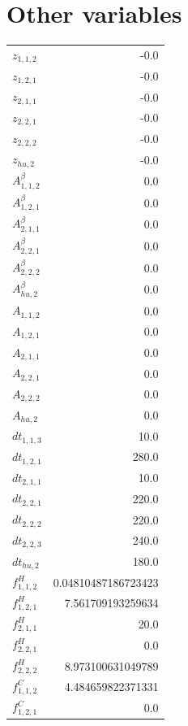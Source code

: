 \documentclass{article}%
\makeatletter
\let\mcnewpage=\newpage%
\newcommand{\TrickSupertabularIntoMulticols}{%
\renewcommand\newpage{%
\if@firstcolumn%
\hrule width\linewidth height0pt%
\columnbreak%
\else%
\mcnewpage%
\fi%
}%
}%
\makeatother
\begin{document}
\section{Other variables}%
\thispagestyle{plain}%
\begin{multicols*}{3}%
\TrickSupertabularIntoMulticols%
%
\begin{supertabular}{lr}%
	$z_{1,1,2}$ & -0.0 \\%
	$z_{1,2,1}$ & -0.0 \\%
	$z_{2,1,1}$ & -0.0 \\%
	$z_{2,2,1}$ & -0.0 \\%
	$z_{2,2,2}$ & -0.0 \\%
	$z_{hu,2}$ & -0.0 \\%
	$A_{1,1,2}^{\beta}$ & 0.0 \\%
	$A_{1,2,1}^{\beta}$ & 0.0 \\%
	$A_{2,1,1}^{\beta}$ & 0.0 \\%
	$A_{2,2,1}^{\beta}$ & 0.0 \\%
	$A_{2,2,2}^{\beta}$ & 0.0 \\%
	$A_{hu,2}^{\beta}$ & 0.0 \\%
	$A_{1,1,2}$ & 0.0 \\%
	$A_{1,2,1}$ & 0.0 \\%
	$A_{2,1,1}$ & 0.0 \\%
	$A_{2,2,1}$ & 0.0 \\%
	$A_{2,2,2}$ & 0.0 \\%
	$A_{hu,2}$ & 0.0 \\%
	$dt_{1,1,3}$ & 10.0 \\%
	$dt_{1,2,1}$ & 280.0 \\%
	$dt_{2,1,1}$ & 10.0 \\%
	$dt_{2,2,1}$ & 220.0 \\%
	$dt_{2,2,2}$ & 220.0 \\%
	$dt_{2,2,3}$ & 240.0 \\%
	$dt_{hu,2}$ & 180.0 \\%
	$f_{1,1,2}^{H}$ & 0.04810487186723423 \\%
	$f_{1,2,1}^{H}$ & 7.561709193259634 \\%
	$f_{2,1,1}^{H}$ & 20.0 \\%
	$f_{2,2,1}^{H}$ & 0.0 \\%
	$f_{2,2,2}^{H}$ & 8.973100631049789 \\%
	$f_{1,1,2}^{C}$ & 4.484659822371331 \\%
	$f_{1,2,1}^{C}$ & 0.0 \\%

\end{supertabular}
\end{multicols*}
\end{document}
